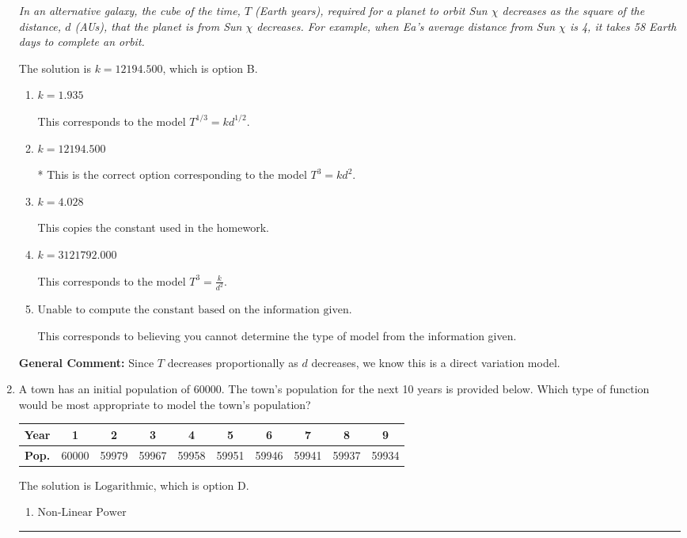 \documentclass{extbook}[14pt]
\newcommand{\litem}[1]{\item #1

\rule{\textwidth}{0.4pt}}
\begin{document}
\begin{enumerate}
{\begin{center}
    \textit{ In an alternative galaxy, the cube of the time, $T$ (Earth years), required for a planet to orbit Sun $\chi$ decreases as the square of the distance, $d$ (AUs), that the planet is from Sun $\chi$ decreases. For example, when Ea's average distance from Sun $\chi$ is 4, it takes 58 Earth days to complete an orbit. }
\end{center}


The solution is \( k = 12194.500 \), which is option B.\begin{enumerate}[label=\Alph*.]
\item \( k = 1.935 \)

This corresponds to the model $T^{1/3} = k d^{1/2}$.
\item \( k = 12194.500 \)

* This is the correct option corresponding to the model $T^{3} = k d^{2}$.
\item \( k = 4.028 \)

This copies the constant used in the homework.
\item \( k = 3121792.000 \)

This corresponds to the model $T^{3} = \frac{k}{d^{2}}$.
\item \( \text{Unable to compute the constant based on the information given.} \)

This corresponds to believing you cannot determine the type of model from the information given.
\end{enumerate}

\textbf{General Comment:} Since $T$ decreases proportionally as $d$ decreases, we know this is a direct variation model.
}
\litem{
A town has an initial population of 60000. The town's population for the next 10 years is provided below. Which type of function would be most appropriate to model the town's population?



\begin{tabular}{c|c|c|c|c|c|c|c|c|c}
\textbf{Year} & 1 & 2 & 3 & 4 & 5 & 6 & 7 & 8 & 9 \tabularnewline
\hline
\textbf{Pop.} & 60000 & 59979 & 59967 & 59958 & 59951 & 59946 & 59941 & 59937 & 59934
\end{tabular} 

The solution is \( \text{Logarithmic} \), which is option D.\begin{enumerate}[label=\Alph*.]
\item \( \text{Non-Linear Power} \)


\end{enumerate}}
\end{enumerate}
\end{document}
